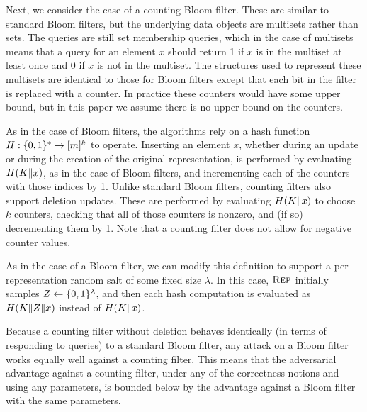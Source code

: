 Next, we consider the case of a counting Bloom filter. These are similar to
standard Bloom filters, but the underlying data objects are multisets rather
than sets. The queries are still set membership queries, which in the case of
multisets means that a query for an element $x$ should return 1 if $x$ is in the
multiset at least once and 0 if $x$ is not in the multiset. The structures used
to represent these multisets are identical to those for Bloom filters except
that each bit in the filter is replaced with a counter. In practice these
counters would have some upper bound, but in this paper we assume there is no
upper bound on the counters.

As in the case of Bloom filters, the algorithms rely on a hash function
$H: \{0,1\}^* \to [m]^k$ to operate. Inserting an element $x$, whether during an
update or during the creation of the original representation, is performed by
evaluating $H(K \Vert x)$, as in the case of Bloom filters, and incrementing
each of the counters with those indices by 1. Unlike standard Bloom filters,
counting filters also support deletion updates. These are performed by
evaluating $H(K \Vert x)$ to choose $k$ counters, checking that all of those
counters is nonzero, and (if so) decrementing them by 1. Note that a counting
filter does not allow for negative counter values.

As in the case of a Bloom filter, we can modify this definition to support a
per-representation random salt of some fixed size $\lambda$. In this case,
$\textsc{Rep}$ initially samples $Z \gets \{0,1\}^\lambda$, and then each hash
computation is evaluated as $H(K \Vert Z \Vert x)$ instead of
$H(K \Vert x)$.

Because a counting filter without deletion behaves identically (in terms of
responding to queries) to a standard Bloom filter, any attack on a Bloom filter
works equally well against a counting filter. This means that the adversarial
advantage against a counting filter, under any of the correctness notions and
using any parameters, is bounded below by the advantage against a Bloom filter
with the same parameters.

